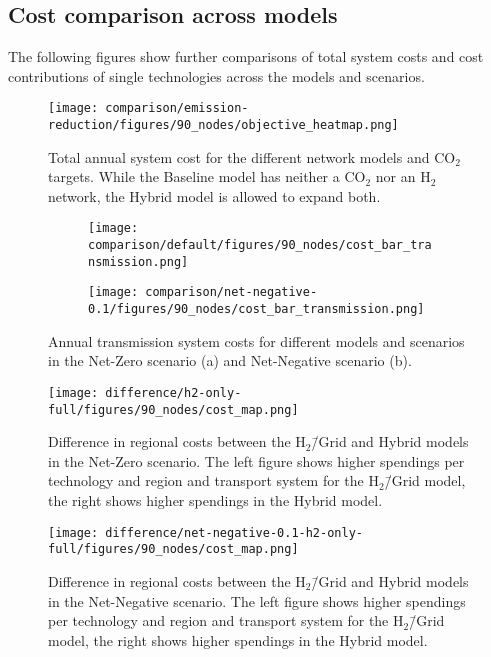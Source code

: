 \documentclass[twocolumn]{article}
\newcommand{\COtwo}{CO$_2$}
\newcommand{\Htwo}{H$_2$}
\newcommand{\Hgrid}{H$_2$\=/Grid}
\newcommand{\modBase}{Baseline model}
\newcommand{\modH}{H$_2$\=/Grid model}
\newcommand{\modHybrid}{Hybrid model}
\begin{document}
\clearpage
\subsection{Cost comparison across models}

The following figures show further comparisons of total system costs and cost contributions of single technologies across the models and scenarios.

\begin{figure}[h!]
    \centering
    \texttt{[image: comparison/emission-reduction/figures/90\_nodes/objective\_heatmap.png]}
    \caption{Total annual system cost for the different network models and \COtwo{} targets. While the \modBase{} has neither a \COtwo{} nor an \Htwo{} network, the \modHybrid{} is allowed to expand both.}
    \label{fig:objective_heatmap}
\end{figure}

\begin{figure}[ht]
    \centering
    \begin{subfigure}{.5\textwidth}
        \centering
        \texttt{[image: comparison/default/figures/90\_nodes/cost\_bar\_transmission.png]}
        \caption{}
        \label{fig:cost_bar_transmission}
    \end{subfigure}%
    \begin{subfigure}{.5\textwidth}
        \centering
        \texttt{[image: comparison/net-negative-0.1/figures/90\_nodes/cost\_bar\_transmission.png]}
        \caption{}
        \label{fig:cost_bar_transmission_nn}
    \end{subfigure}
    \caption{Annual transmission system costs for different models and scenarios in the Net-Zero scenario (a) and Net-Negative scenario (b).}
\end{figure}


\begin{figure}[ht!]
    \centering
    \texttt{[image: difference/h2-only-full/figures/90\_nodes/cost\_map.png]}
    \caption{Difference in regional costs between the \Hgrid{} and \modHybrid{}s in the Net-Zero scenario. The left figure shows higher spendings per technology and region and transport system for the \modH{}, the right shows higher spendings in the \modHybrid{}.}
    \label{fig:cost_map_difference}
\end{figure}


\begin{figure}[ht!]
    \centering
    \texttt{[image: difference/net-negative-0.1-h2-only-full/figures/90\_nodes/cost\_map.png]}
    \caption{Difference in regional costs between the \Hgrid{} and \modHybrid{}s in the Net-Negative scenario. The left figure shows higher spendings per technology and region and transport system for the \modH{}, the right shows higher spendings in the \modHybrid{}.}
    \label{fig:cost_map_difference_nn}
\end{figure}
\end{document}
